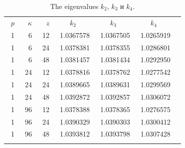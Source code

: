 \documentclass[runningheads,a4paper]{llncs}
\begin{document}
\begin{table}[htp]
\caption{The eigenvalues $k_2$, $k_3$ и $k_4$.}
\label{t-3}
\begin{center}
\begin{tabular}{rrrrrrr}
\rowcolor{col1}
$p$ & $\kappa$ & $z$ &\multicolumn{1}{c}{$k_2$} & \multicolumn{1}{c}{$k_3$} & \multicolumn{1}{c}{$k_4$} \\
\rowcolor{col3}
~1& ~~6& ~12& ~1.0367578& ~1.0367505& ~1.0265919 \\
\rowcolor{col2}
1& 6& 24& 1.0378381&	1.0378355&	1.0286801 \\
\rowcolor{col1}
1& 6& 48& 1.0381457&	1.0381434&	1.0292950\\
\rowcolor{col3}
1& 24& 12& 1.0378816&	1.0378762&	1.0277542\\
\rowcolor{col3}
1& 24& 24& 1.0389665&	1.0389631&	1.0299569\\
\rowcolor{col1}
1& 24& 48& 1.0392872&	1.0392857&	1.0306072\\
\rowcolor{col3}
1& 96& 12& 1.0378388&	1.0378365&	1.0276575\\
\rowcolor{col2}
1& 96& 24& 1.0390329&	1.0390303&	1.0300412\\
\rowcolor{col1}
1& 96& 48& 1.0393812&	1.0393798&	1.0307428\\
\rowcolor{col3}
\end{tabular}
\end{center}
\end{table}
\end{document}
